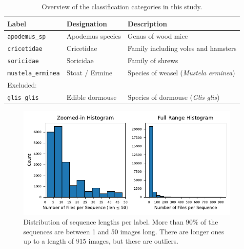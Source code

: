     \begin{table}[ht]
    \centering
    \caption{Overview of the classification categories in this study.}
    \label{tab:class_labels}
    \begin{tabular}{lll}
    \toprule
    \textbf{Label} & \textbf{Designation} & \textbf{Description} \\
    \midrule
    \texttt{apodemus\_sp}     & Apodemus species        & Genus of wood mice \\
    \texttt{cricetidae}       & Cricetidae              & Family including voles and hamsters \\
    \texttt{soricidae}        & Soricidae               & Family of shrews \\
    \texttt{mustela\_erminea} & Stoat / Ermine          & Species of weasel (\textit{Mustela erminea}) \\
    \midrule
    \multicolumn{3}{l}{Excluded:} \\
    \texttt{glis\_glis}       & Edible dormouse         & Species of dormouse (\textit{Glis glis}) \\
    \bottomrule
    \end{tabular}
    \end{table}

    

    \begin{figure}[H]
    \centering
    \includegraphics{figures/seq_len_histograms.pdf}
    \caption{Distribution of sequence lengths per label. More than 90\% of the sequences are between 1 and 50 images long. There are longer ones up to a length of 915 images, but these are outliers.}
    \label{fig:seq_len_histograms}
    \end{figure}

